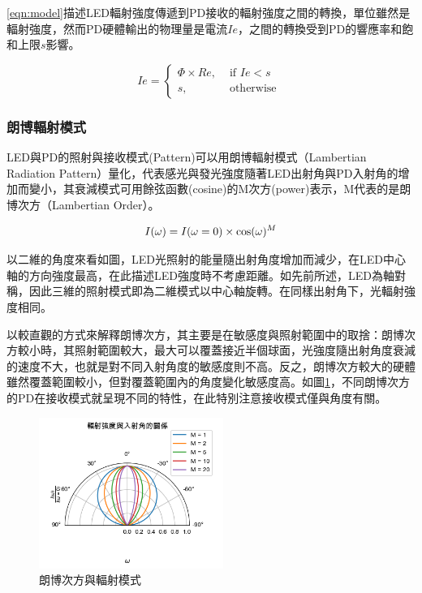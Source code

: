         \ref{eqn:model}描述LED輻射強度傳遞到PD接收的輻射強度之間的轉換，單位雖然是輻射強度，然而PD硬體輸出的物理量是電流$Ie$，之間的轉換受到PD的響應率和飽和上限$s$影響。


        \begin{equation}
            \label{eqn:current}
            Ie = \begin{cases}\Phi\times Re, & \text { if } Ie<s \\ s, & \text { otherwise }\end{cases}
        \end{equation}

        \subsubsection{朗博輻射模式}

        LED與PD的照射與接收模式(Pattern)可以用朗博輻射模式（Lambertian Radiation Pattern）量化，代表感光與發光強度隨著LED出射角與PD入射角的增加而變小，其衰減模式可用餘弦函數(cosine)的M次方(power)表示，M代表的是朗博次方（Lambertian Order）。

        \begin{equation}
            \label{eqn:lambertian_pattern}
            I(\omega)=I(\omega=0)\times\cos(\omega)^{M}\\
        \end{equation}

        以二維的角度來看如圖，LED光照射的能量隨出射角度增加而減少，在LED中心軸的方向強度最高，在此描述LED強度時不考慮距離。如先前所述，LED為軸對稱，因此三維的照射模式即為二維模式以中心軸旋轉。在同樣出射角下，光輻射強度相同。
        
        

        以較直觀的方式來解釋朗博次方，其主要是在敏感度與照射範圍中的取捨：朗博次方較小時，其照射範圍較大，最大可以覆蓋接近半個球面，光強度隨出射角度衰減的速度不大，也就是對不同入射角度的敏感度則不高。反之，朗博次方較大的硬體雖然覆蓋範圍較小，但對覆蓋範圍內的角度變化敏感度高。如圖\ref{pic:lambertian}，不同朗博次方的PD在接收模式就呈現不同的特性，在此特別注意接收模式僅與角度有關。

        \begin{figure}[ht]
            \centering
            \includegraphics[width=6cm]{ch2pic/lambertian.png}
            \caption{朗博次方與輻射模式}
            \label{pic:lambertian}
        \end{figure}

